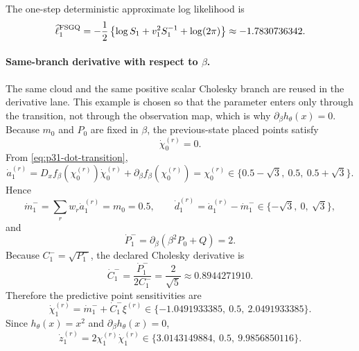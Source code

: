 \documentclass[11pt]{article}
\numberwithin{equation}{section}
\newcommand{\ellhat}{\widehat\ell}
\begin{document}
The one-step deterministic approximate log likelihood is
\begin{equation}
  \ellhat_1^{\rm FSGQ}
  =
  -\frac12\left\{\log S_1+v_1^2S_1^{-1}+\log(2\pi)\right\}
  \approx -1.7830736342.
  \label{eq:p32-example-ell}
\end{equation}

\paragraph{Same-branch derivative with respect to \texorpdfstring{\(\beta\)}{beta}.}
The same cloud and the same positive scalar Cholesky branch are reused in the
derivative lane.  This example is chosen so that the parameter enters only
through the transition, not through the observation map, which is why
\(\partial_\beta h_\theta(x)=0\).  Because \(m_0\) and \(P_0\) are fixed in \(\beta\), the
previous-state placed points satisfy
\begin{equation}
  \dot\chi_0^{(r)}=0.
  \label{eq:p32-example-prev-dot}
\end{equation}
From \eqref{eq:p31-dot-transition},
\begin{equation}
  \dot a_1^{(r)}
  =
  D_xf_\beta(\chi_0^{(r)})\dot\chi_0^{(r)}+\partial_\beta f_\beta(\chi_0^{(r)})
  =
  \chi_0^{(r)}
  \in
  \{0.5-\sqrt3,\ 0.5,\ 0.5+\sqrt3\}.
  \label{eq:p32-example-adot}
\end{equation}
Hence
\begin{equation}
  \dot m_1^-=
  \sum_rw_r\dot a_1^{(r)}=m_0=0.5,
  \qquad
  \dot d_1^{(r)}=\dot a_1^{(r)}-\dot m_1^-
  \in
  \{-\sqrt3,\ 0,\ \sqrt3\},
  \label{eq:p32-example-mdot-dotd}
\end{equation}
and
\begin{equation}
  \dot P_1^-=
  \partial_\beta(\beta^2P_0+Q)=2.
  \label{eq:p32-example-Pminus-dot}
\end{equation}
Because \(C_1^-=\sqrt{P_1^-}\), the declared Cholesky derivative is
\begin{equation}
  \dot C_1^-=
  \frac{\dot P_1^-}{2C_1^-}
  =
  \frac{2}{\sqrt5}
  \approx 0.8944271910.
  \label{eq:p32-example-Cdot}
\end{equation}
Therefore the predictive point sensitivities are
\begin{equation}
  \dot\chi_1^{(r)}=\dot m_1^-+\dot C_1^-\xi^{(r)}
  \in
  \{-1.0491933385,\ 0.5,\ 2.0491933385\}.
  \label{eq:p32-example-chidot}
\end{equation}
Since \(h_\theta(x)=x^2\) and \(\partial_\beta h_\theta(x)=0\),
\begin{equation}
  \dot z_1^{(r)}=2\chi_1^{(r)}\dot\chi_1^{(r)}
  \in
  \{3.0143149884,\ 0.5,\ 9.9856850116\}.
  \label{eq:p32-example-zdot}
\end{equation}
\end{document}
